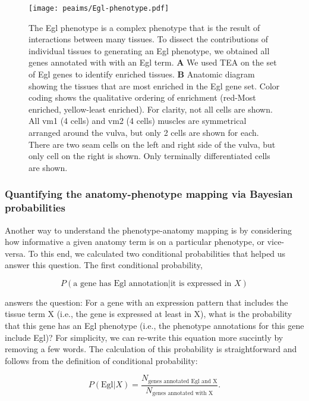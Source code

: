 \begin{figure}[htbp]
  \renewcommand{\familydefault}{\sfdefault}\normalfont{}
  \centering
  \texttt{[image: peaims/Egl-phenotype.pdf]}
  \caption{The Egl phenotype is a complex phenotype that is the result of
  interactions between many tissues. To dissect the contributions of individual
  tissues to generating an Egl phenotype, we obtained all genes annotated with
  with an Egl term. \textbf{A} We used TEA on the set of Egl genes to identify
  enriched tissues. \textbf{B} Anatomic diagram showing the tissues that are
  most enriched in the Egl gene set. Color coding shows the qualitative
  ordering of enrichment (red-Most enriched, yellow-least enriched). For clarity,
  not all cells are shown. All vm1 (4 cells) and vm2 (4 cells) muscles are
  symmetrical arranged around the vulva, but only 2 cells are shown for each.
  There are two seam cells on the left and right side of the vulva, but only
  cell on the right is shown. Only terminally differentiated cells are shown.}
\label{fig:egl}
\end{figure}


\subsubsection*{Quantifying the anatomy-phenotype
                mapping via Bayesian probabilities}
Another way to understand the phenotype-anatomy mapping is by considering
how informative a given anatomy term is on a particular phenotype, or vice-versa.
To this end, we calculated two conditional probabilities that helped us answer
this question. The first conditional probability,

\begin{equation}
  P( \text{a gene has Egl annotation} | \text{it is expressed in } X)
\end{equation}

answers the question: For a gene with an expression pattern that includes the
tissue term X (i.e., the gene is expressed at least in X), what is the probability
that this gene has an Egl phenotype (i.e., the phenotype annotations for this
gene include Egl)? For simplicity, we can re-write this equation more succintly
by removing a few words. The calculation of this probability is straightforward
and follows from the definition of conditional probability:

\begin{equation}
  P(\text{Egl}|X) = \frac{N_\text{genes annotated Egl and X}}
                         {N_\text{genes annotated with X}}.
\label{egl_x}
\end{equation}

